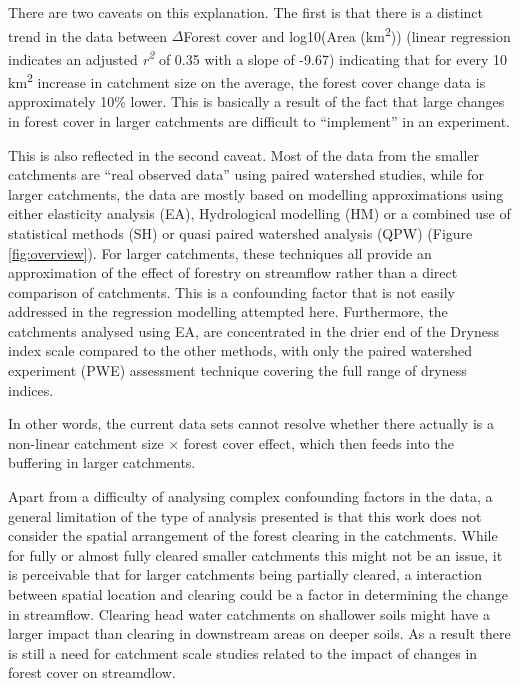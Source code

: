 \documentclass[]{elsarticle} %
\begin{document}
There are two caveats on this explanation. The first is that there is a distinct trend in the data between \(\Delta\)Forest cover and log10(Area (km\textsuperscript{2})) (linear regression indicates an adjusted \emph{r\textsuperscript{2}} of 0.35 with a slope of -9.67) indicating that for every 10 km\textsuperscript{2} increase in catchment size on the average, the forest cover change data is approximately 10\% lower. This is basically a result of the fact that large changes in forest cover in larger catchments are difficult to ``implement'' in an experiment.

This is also reflected in the second caveat. Most of the data from the smaller catchments are ``real observed data'' using paired watershed studies, while for larger catchments, the data are mostly based on modelling approximations using either elasticity analysis (EA), Hydrological modelling (HM) or a combined use of statistical methods (SH) or quasi paired watershed analysis (QPW) (Figure \ref{fig:overview}). For larger catchments, these techniques all provide an approximation of the effect of forestry on streamflow rather than a direct comparison of catchments. This is a confounding factor that is not easily addressed in the regression modelling attempted here. Furthermore, the catchments analysed using EA, are concentrated in the drier end of the Dryness index scale compared to the other methods, with only the paired watershed experiment (PWE) assessment technique covering the full range of dryness indices.

In other words, the current data sets cannot resolve whether there actually is a non-linear catchment size × forest cover effect, which then feeds into the buffering in larger catchments.

Apart from a difficulty of analysing complex confounding factors in the data, a general limitation of the type of analysis presented is that this work does not consider the spatial arrangement of the forest clearing in the catchments. While for fully or almost fully cleared smaller catchments this might not be an issue, it is perceivable that for larger catchments being partially cleared, a interaction between spatial location and clearing could be a factor in determining the change in streamflow. Clearing head water catchments on shallower soils might have a larger impact than clearing in downstream areas on deeper soils. As a result there is still a need for catchment scale studies related to the impact of changes in forest cover on streamdlow.
\end{document}
